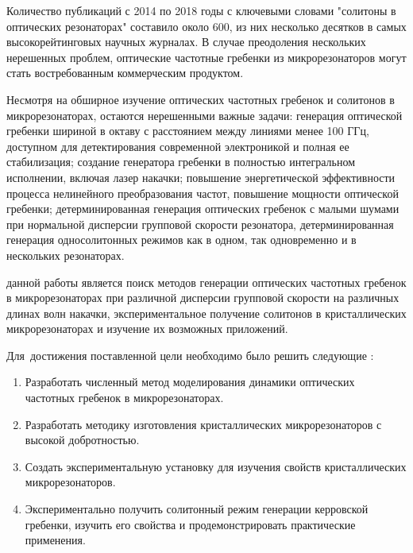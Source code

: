 Количество публикаций с 2014 по 2018 годы с ключевыми словами "солитоны в оптических резонаторах" составило около 600, из них несколько десятков в самых высокорейтинговых научных журналах. В случае преодоления нескольких нерешенных проблем, оптические частотные гребенки из микрорезонаторов могут стать востребованным коммерческим продуктом.

Несмотря на обширное изучение оптических частотных гребенок и солитонов в микрорезонаторах, остаются нерешенными важные задачи: генерация оптической гребенки шириной в октаву с расстоянием между линиями менее 100 ГГц, доступном для детектирования современной электроникой и полная ее стабилизация; создание генератора гребенки в полностью интегральном исполнении, включая лазер накачки; повышение энергетической эффективности процесса нелинейного преобразования частот, повышение мощности оптической гребенки; детерминированная генерация оптических гребенок с малыми шумами при нормальной дисперсии групповой скорости резонатора, детерминированная генерация односолитонных режимов как в одном, так одновременно и в нескольких резонаторах.



{\aim} данной работы является поиск методов генерации оптических частотных гребенок в микрорезонаторах при различной дисперсии групповой скорости на различных длинах волн накачки, экспериментальное получение солитонов в кристаллических микрорезонаторах и изучение их возможных приложений.

Для~достижения поставленной цели необходимо было решить следующие {\tasks}:
\begin{enumerate}
  \item Разработать численный метод моделирования динамики оптических частотных гребенок в микрорезонаторах.
  \item Разработать методику изготовления кристаллических микрорезонаторов с высокой добротностью.
  \item Создать экспериментальную установку для изучения свойств кристаллических микрорезонаторов.
  \item Экспериментально получить солитонный режим генерации керровской гребенки, изучить его свойства и продемонстрировать практические применения.
\end{enumerate}


